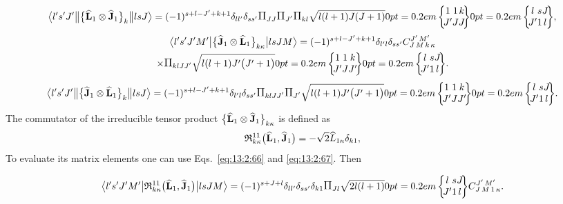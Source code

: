 \begin{multline*}
\braOketred{ l^{\prime} s^{\prime} J^{\prime}}{\bigl\{\widehat{\vect{L}}_{1} \otimes \widehat{\vect{J}}_{1}\bigr\}_{k}}{l s J}=(-1)^{s+l-J^{\prime}+k+1} \delta_{l l^{\prime}} \delta_{s s^{\prime}}
\Fact{J J}\Fact{J^{\prime}} \Fact{k l}\sqrt{ l(l+1) J(J+1)} 
\sixj{1}{1}{k}{J^{\prime}}{J}{J}
\sixj{l}{s}{J}{J^{\prime}}{1}{l},
\end{multline*}
\begin{multline}
\braOket{ l^{\prime} s^{\prime} J^{\prime} M^{\prime}}{\bigl\{\widehat{\vect{J}}_{1} \otimes \widehat{\vect{L}}_{1}\bigr\}_{k \kappa}}{l s J M}=(-1)^{s+l-J^{\prime}+k+1} \delta_{l^{\prime} l} \delta_{s s^{\prime}}
\clebsch{J}{M}{k}{\kappa}{J^{\prime}}{M^{\prime}}\\
\times \Fact{k l J J^\prime}\sqrt{ l(l+1) J^{\prime}\bigl(J^{\prime}+1\bigr)}
\sixj{1}{1}{k}{J^{\prime}}{J}{J^{\prime}}
\sixj{l}{s}{J}{J^{\prime}}{1}{l} . \label{eq:13:2:87}
\end{multline}
\begin{multline*}
\braOketred{ l^{\prime} s^{\prime} J^{\prime}}{\bigl\{\widehat{\vect{J}}_{1} \otimes \widehat{\vect{L}}_{1}\bigr\}_{k}}{l s J}=(-1)^{s+l-J^{\prime}+k+1} \delta_{l^{\prime} l} \delta_{s s^{\prime}}
\Fact{k l J J^\prime}\Fact{J^{\prime}}\sqrt{ l(l+1) J^{\prime}\bigl(J^{\prime}+1\bigr)} 
\sixj{1}{1}{k}{J^{\prime}}{J}{J^{\prime}}
\sixj{l}{s}{J}{J^{\prime}}{1}{l} .
\end{multline*}
The commutator of the irreducible tensor product \(\bigl\{\widehat{\mathbf{L}}_{1} \otimes \widehat{\mathbf{J}}_{1}\bigr\}_{k \kappa}\) is defined as
\begin{equation}
\mathfrak{R}_{k \kappa}^{11}\bigl(\widehat{\mathbf{L}}_{1}, \widehat{\mathbf{J}}_{1}\bigr)=-\sqrt{2} \widehat{L}_{1 \kappa} \delta_{k 1}, \label{eq:13:2:88}
\end{equation}
To evaluate its matrix elements one can use Eqs.~\eqref{eq:13:2:66} and \eqref{eq:13:2:67}. Then

\begin{equation}
\braOket{ l^{\prime} s^{\prime} J^{\prime} M^{\prime}}{ \mathfrak{R}_{k \kappa}^{11}\bigl(\widehat{\vect{L}}_{1}, \widehat{\vect{J}}_{1}\bigr)}{l s J M}=(-1)^{s+J+l} \delta_{l l^{\prime}} \delta_{s s^{\prime}} \delta_{k 1} \Fact{J l}\sqrt{2 l(l+1)}
\sixj{l}{s}{J}{J^{\prime}}{1}{l} 
\clebsch{J}{M}{1}{\kappa}{J^{\prime}}{M^{\prime}}. \label{eq:13:2:89}
\end{equation}


